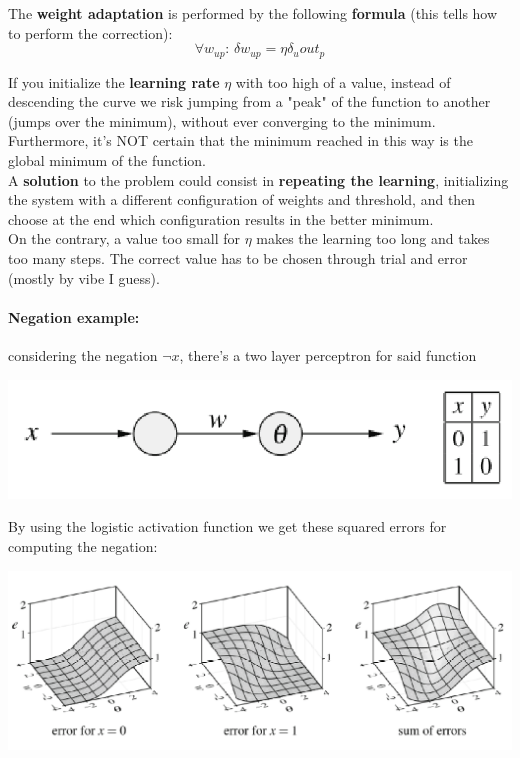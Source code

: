 \documentclass[11pt]{article}
\begin{document}
		The \textbf{weight adaptation} is performed by the following \textbf{formula} (this tells how to perform the correction):
		$$ \forall w_{up} : \, \delta w_{up} = \eta \delta_u out_p $$
		
		If you initialize the \textbf{learning rate} $\eta$ with too high of a value, instead of descending the curve we risk jumping from a "peak" of the function to another (jumps over the minimum), without ever converging to the minimum. Furthermore, it's NOT certain that the minimum reached in this way is the global minimum of the function. \\
		
		A \textbf{solution} to the problem could consist in \textbf{repeating the learning}, initializing the system with a different configuration of weights and threshold, and then choose at the end which configuration results in the better minimum.\\
		
		On the contrary, a value too small for $\eta$ makes the learning too long and takes too many steps. The correct value has to be chosen through trial and error (mostly by vibe I guess).\\
		
		
		\paragraph{Negation example:} considering the negation $\neg x$, there's a two layer perceptron for said function
		\begin{center}
			\includegraphics[width=0.5\columnwidth]{img/NN/neg1}
		\end{center}
		By using the logistic activation function we get these squared errors for computing the negation:
		\begin{center}
			\includegraphics[width=0.9\columnwidth]{img/NN/neg2}
		\end{center}
		
\end{document}

